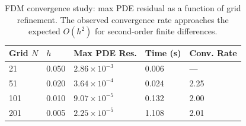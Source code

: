 \begin{table}[t]
\centering
\caption{FDM convergence study: max PDE residual as a function of grid refinement. The observed convergence rate approaches the expected $O(h^2)$ for second-order finite differences.}
\label{tab:convergence}
\begin{tabular}{lllll}
\toprule
Grid $N$ & $h$ & Max PDE Res. & Time (s) & Conv. Rate \\
\midrule
  21 & 0.050 & $2.86{\times}10^{-3}$ & 0.006 & --- \\
  51 & 0.020 & $3.64{\times}10^{-4}$ & 0.024 & 2.25 \\
  101 & 0.010 & $9.07{\times}10^{-5}$ & 0.132 & 2.00 \\
  201 & 0.005 & $2.25{\times}10^{-5}$ & 1.108 & 2.01 \\
\bottomrule
\end{tabular}
\end{table}
